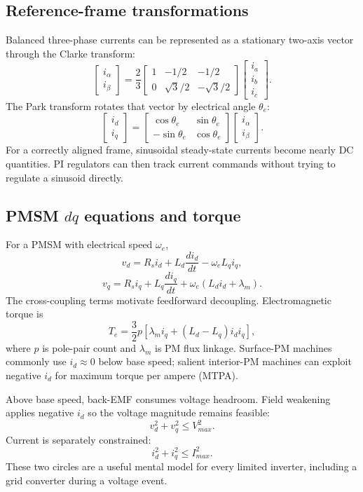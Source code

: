 \documentclass[11pt]{article}
\begin{document}
\subsection{Reference-frame transformations}
Balanced three-phase currents can be represented as a stationary two-axis vector through the Clarke transform:
\[
\begin{bmatrix}i_\alpha\\i_\beta\end{bmatrix}=
\frac{2}{3}
\begin{bmatrix}1&-1/2&-1/2\\0&\sqrt3/2&-\sqrt3/2\end{bmatrix}
\begin{bmatrix}i_a\\i_b\\i_c\end{bmatrix}.
\]
The Park transform rotates that vector by electrical angle $\theta_e$:
\[
\begin{bmatrix}i_d\\i_q\end{bmatrix}=
\begin{bmatrix}\cos\theta_e&\sin\theta_e\\-\sin\theta_e&\cos\theta_e\end{bmatrix}
\begin{bmatrix}i_\alpha\\i_\beta\end{bmatrix}.
\]
For a correctly aligned frame, sinusoidal steady-state currents become nearly DC quantities. PI regulators can then track current commands without trying to regulate a sinusoid directly.

\subsection{PMSM $dq$ equations and torque}
For a PMSM with electrical speed $\omega_e$,
\[
v_d=R_si_d+L_d\frac{di_d}{dt}-\omega_eL_qi_q,
\]
\[
v_q=R_si_q+L_q\frac{di_q}{dt}+\omega_e(L_di_d+\lambda_m).
\]
The cross-coupling terms motivate feedforward decoupling. Electromagnetic torque is
\[
T_e=\frac{3}{2}p\left[\lambda_m i_q+(L_d-L_q)i_di_q\right],
\]
where $p$ is pole-pair count and $\lambda_m$ is PM flux linkage. Surface-PM machines commonly use $i_d\approx0$ below base speed; salient interior-PM machines can exploit negative $i_d$ for maximum torque per ampere (MTPA).

Above base speed, back-EMF consumes voltage headroom. Field weakening applies negative $i_d$ so the voltage magnitude remains feasible:
\[
v_d^2+v_q^2\leq V_{max}^2.
\]
Current is separately constrained:
\[
i_d^2+i_q^2\leq I_{max}^2.
\]
These two circles are a useful mental model for every limited inverter, including a grid converter during a voltage event.
\end{document}
